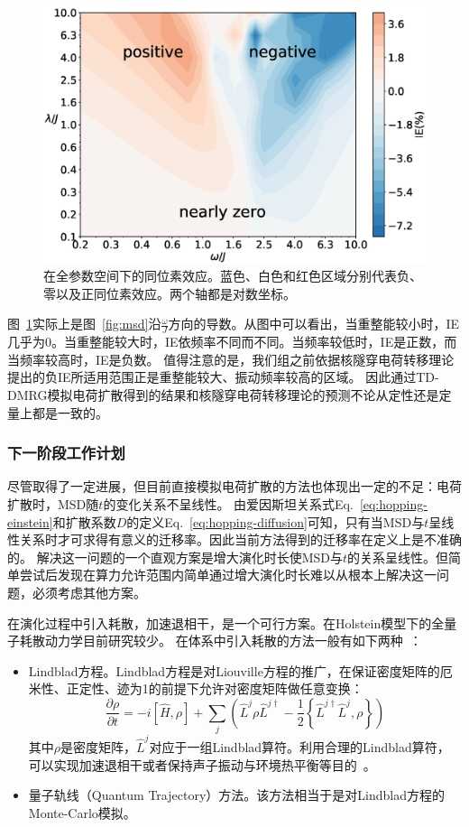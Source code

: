 \documentclass{article}
\begin{document}
\begin{figure}[ht]
    \centering
	\includegraphics[width=.6\linewidth]{ie}
	\caption{\label{fig:ie}在全参数空间下的同位素效应。蓝色、白色和红色区域分别代表负、零以及正同位素效应。两个轴都是对数坐标。}
\end{figure}

图~\ref{fig:ie}实际上是图~\ref{fig:msd}沿$\frac{\omega}{J}$方向的导数。从图中可以看出，当重整能较小时，IE几乎为0。当重整能较大时，IE依频率不同而不同。当频率较低时，IE是正数，而当频率较高时，IE是负数。
值得注意的是，我们组之前依据核隧穿电荷转移理论提出的负IE所适用范围正是重整能较大、振动频率较高的区域。
因此通过TD-DMRG模拟电荷扩散得到的结果和核隧穿电荷转移理论的预测不论从定性还是定量上都是一致的。

\subsubsection{下一阶段工作计划}
尽管取得了一定进展，但目前直接模拟电荷扩散的方法也体现出一定的不足：电荷扩散时，MSD随$t$的变化关系不呈线性。
由爱因斯坦关系式Eq.~\ref{eq:hopping-einstein}和扩散系数$D$的定义Eq.~\ref{eq:hopping-diffusion}可知，只有当MSD与$t$呈线性关系时才可求得有意义的迁移率。因此当前方法得到的迁移率在定义上是不准确的。
解决这一问题的一个直观方案是增大演化时长使MSD与$t$的关系呈线性。但简单尝试后发现在算力允许范围内简单通过增大演化时长难以从根本上解决这一问题，必须考虑其他方案。

在演化过程中引入耗散，加速退相干，是一个可行方案。在Holstein模型下的全量子耗散动力学目前研究较少。
在体系中引入耗散的方法一般有如下两种~\cite{Schol11}：
\begin{itemize}
    \item Lindblad方程。Lindblad方程是对Liouville方程的推广，在保证密度矩阵的厄米性、正定性、迹为1的前提下允许对密度矩阵做任意变换：
    \begin{equation}
        \frac{\partial \rho}{\partial t} = -i [\hat H, \rho] 
        + \sum_{j} \left ( \hat L^j \rho \hat L^{j\dagger} - \frac{1}{2} \left\{ \hat L^{j\dagger} \hat L^j, \rho \right\} \right) 
    \end{equation}
    其中$\rho$是密度矩阵，$\hat L^j$对应于一组Lindblad算符。利用合理的Lindblad算符，
    可以实现加速退相干或者保持声子振动与环境热平衡等目的~\cite{Breuer06, Pearle12}。
    \item 量子轨线（Quantum Trajectory）方法。该方法相当于是对Lindblad方程的Monte-Carlo模拟。
\end{itemize}
\end{document}
